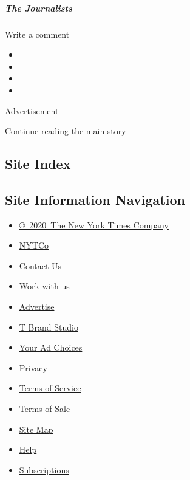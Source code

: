 \hypertarget{the-journalists}{%
\subparagraph{The Journalists}\label{the-journalists}}

Write a comment

\begin{itemize}
\item
\item
\item
\item
\end{itemize}

Advertisement

\protect\hyperlink{after-bottom}{Continue reading the main story}

\hypertarget{site-index}{%
\subsection{Site Index}\label{site-index}}

\hypertarget{site-information-navigation}{%
\subsection{Site Information
Navigation}\label{site-information-navigation}}

\begin{itemize}
\tightlist
\item
  \href{https://help.nytimes.com/hc/en-us/articles/115014792127-Copyright-notice}{©~2020~The
  New York Times Company}
\end{itemize}

\begin{itemize}
\tightlist
\item
  \href{https://www.nytco.com/}{NYTCo}
\item
  \href{https://help.nytimes.com/hc/en-us/articles/115015385887-Contact-Us}{Contact
  Us}
\item
  \href{https://www.nytco.com/careers/}{Work with us}
\item
  \href{https://nytmediakit.com/}{Advertise}
\item
  \href{http://www.tbrandstudio.com/}{T Brand Studio}
\item
  \href{https://www.nytimes.com/privacy/cookie-policy\#how-do-i-manage-trackers}{Your
  Ad Choices}
\item
  \href{https://www.nytimes.com/privacy}{Privacy}
\item
  \href{https://help.nytimes.com/hc/en-us/articles/115014893428-Terms-of-service}{Terms
  of Service}
\item
  \href{https://help.nytimes.com/hc/en-us/articles/115014893968-Terms-of-sale}{Terms
  of Sale}
\item
  \href{https://spiderbites.nytimes.com}{Site Map}
\item
  \href{https://help.nytimes.com/hc/en-us}{Help}
\item
  \href{https://www.nytimes.com/subscription?campaignId=37WXW}{Subscriptions}
\end{itemize}
